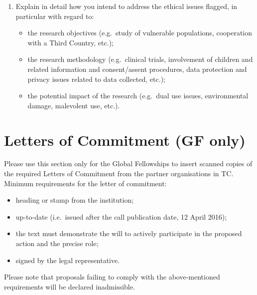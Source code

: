 \documentclass[a4paper,11pt]{article}
\begin{document}
\begin{enumerate}[resume]
\item Explain in detail how you intend to address the ethical issues flagged, in particular with regard to:
\begin{itemize}
\item the research objectives (e.g.~study of vulnerable populations, cooperation with a Third Country, etc.);
\item the research methodology (e.g.~clinical trials, involvement of children and related information and consent/assent procedures, data protection and privacy issues related to data collected, etc.);
\item the potential impact of the research (e.g.~dual use issues, environmental damage, malevolent use, etc.).
\end{itemize}
\end{enumerate}

\newpage

\section{Letters of Commitment (GF only)}
	
Please use this section only for the Global Fellowships to insert scanned copies of the required Letters of Commitment from the partner organisations in TC. Minimum requirements for the letter of commitment:  

\begin{itemize}
\item heading or stamp from the institution;
\item up-to-date (i.e.~issued after the call publication date, 12 April 2016);
\item the text must demonstrate the will to actively participate in the proposed action and the precise role; 
\item signed by the legal representative.
\end{itemize}

Please note that proposals failing to comply with the above-mentioned requirements will be declared inadmissible.

\newpage
\end{document}

